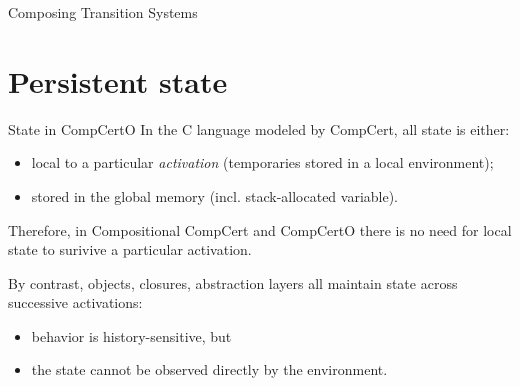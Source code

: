 \documentclass[aspectratio=1610,12pt]{beamer}
\begin{document}
\begin{frame}{Composing Transition Systems \fbox{$\odot$}}
\end{frame}


\section{Persistent state} %

\begin{frame}{State in CompCertO} %
  In the C language modeled by CompCert,
  all state is either:
  \begin{itemize}
    \item local to a particular \emph{activation}
      (temporaries stored in a local environment);
    \item stored in the global memory
      (incl. stack-allocated variable).
  \end{itemize}
  Therefore,
  in Compositional CompCert and CompCertO
  there is no need for local state
  to surivive a particular activation.

  \vfill
  By contrast,
  objects, closures, abstraction layers
  all maintain state across successive activations:
  \begin{itemize}
    \item behavior is history-sensitive, but
    \item the state cannot be observed directly by the environment.
  \end{itemize}


\end{frame}
\end{document}
